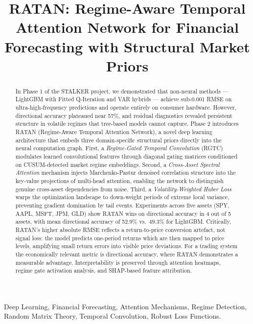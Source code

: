 \documentclass[conference]{IEEEtran}
\title{RATAN: Regime-Aware Temporal Attention Network for Financial Forecasting with Structural Market Priors}
\author{
\IEEEauthorblockN{Vaiditya Tanwar}
\IEEEauthorblockA{School of Technology, Rishihood University \\
EN No: 230086 \\
vaiditya.t23csai@nst.rishihood.edu.in}
\and
\IEEEauthorblockN{Yashi Gupta}
\IEEEauthorblockA{School of Technology, Rishihood University \\
EN No: 230072 \\
yashi.g23csai@nst.rishihood.edu.in}
}
\begin{document}
\maketitle

\begin{abstract}
In Phase 1 of the STALKER project, we demonstrated that non-neural methods --- LightGBM with Fitted Q-Iteration and VAR hybrids --- achieve sub-0.001 RMSE on ultra-high-frequency predictions and operate entirely on consumer hardware. However, directional accuracy plateaued near 57\%, and residual diagnostics revealed persistent structure in volatile regimes that tree-based models cannot capture. Phase 2 introduces RATAN (Regime-Aware Temporal Attention Network), a novel deep learning architecture that embeds three domain-specific structural priors directly into the neural computation graph. First, a \textit{Regime-Gated Temporal Convolution} (RGTC) modulates learned convolutional features through diagonal gating matrices conditioned on CUSUM-detected market regime embeddings. Second, a \textit{Cross-Asset Spectral Attention} mechanism injects Marchenko-Pastur denoised correlation structure into the key-value projections of multi-head attention, enabling the network to distinguish genuine cross-asset dependencies from noise. Third, a \textit{Volatility-Weighted Huber Loss} warps the optimization landscape to down-weight periods of extreme local variance, preventing gradient domination by tail events. Experiments across five assets (SPY, AAPL, MSFT, JPM, GLD) show RATAN wins on directional accuracy in 4 out of 5 assets, with mean directional accuracy of 52.9\% vs.\ 49.3\% for LightGBM. Critically, RATAN's higher absolute RMSE reflects a return-to-price conversion artefact, not signal loss: the model predicts one-period returns which are then mapped to price levels, amplifying small return errors into visible price deviations. For a trading system the economically relevant metric is directional accuracy, where RATAN demonstrates a measurable advantage. Interpretability is preserved through attention heatmaps, regime gate activation analysis, and SHAP-based feature attribution.
\end{abstract}

\begin{IEEEkeywords}
Deep Learning, Financial Forecasting, Attention Mechanisms, Regime Detection, Random Matrix Theory, Temporal Convolution, Robust Loss Functions.
\end{IEEEkeywords}

\end{document}
